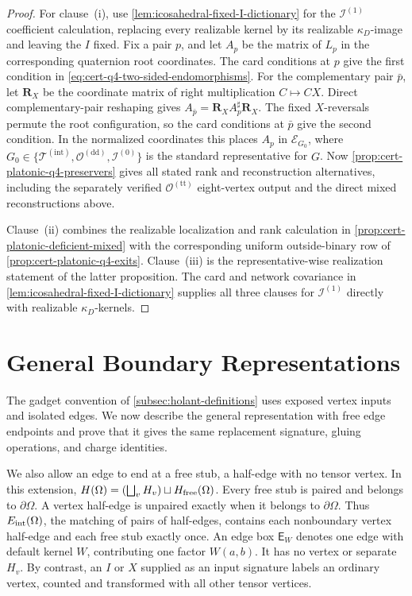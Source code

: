 \documentclass[11pt,letterpaper,onecolumn]{article}
\theoremstyle{plain}
\theoremstyle{definition}
\theoremstyle{remark}
\newcommand{\TetInt}{{\mathcal T^{(\mathrm{int})}}}
\newcommand{\OctDD}{{\mathcal O^{(\mathrm{dd})}}}
\newcommand{\OctTT}{{\mathcal O^{(\mathrm{tt})}}}
\newcommand{\IcoZero}{{\mathcal I^{(0)}}}
\newcommand{\IcoOne}{{\mathcal I^{(1)}}}
\begin{document}
\begin{proof}
For clause~\textnormal{(i)}, use
\cref{lem:icosahedral-fixed-I-dictionary} for the \(\IcoOne\)
coefficient calculation, replacing every realizable kernel by its realizable
\(\kappa_D\)-image and leaving the \(I\) fixed.  Fix a pair \(p\), and let \(A_p\)
be the matrix of \(L_p\) in the corresponding quaternion root coordinates.
The card conditions at \(p\) give the first condition in
\cref{eq:cert-q4-two-sided-endomorphisms}.  For the complementary pair
\(\bar p\), let \(\mathbf R_X\) be the coordinate matrix of right
multiplication \(C\mapsto CX\).  Direct complementary-pair reshaping gives
\(A_{\bar p}=\mathbf R_XA_p^\sharp\mathbf R_X\). The fixed \(X\)-reversals
permute the root configuration, so the card conditions at \(\bar p\) give
the second condition. In the normalized coordinates this places \(A_p\) in
\(\mathscr E_{G_0}\), where \(G_0\in\{\TetInt,\OctDD,\IcoZero\}\) is the standard representative for \(G\).
Now \cref{prop:cert-platonic-q4-preservers} gives all stated rank and
reconstruction alternatives, including the separately verified
\(\OctTT\) eight-vertex output and the direct mixed reconstructions above.

Clause~\textnormal{(ii)} combines the realizable localization and rank
calculation in \cref{prop:cert-platonic-deficient-mixed} with the
corresponding uniform outside-binary row of
\cref{prop:cert-platonic-q4-exits}.  Clause~\textnormal{(iii)} is the
representative-wise realization statement of the latter proposition.  The
card and network covariance in
\cref{lem:icosahedral-fixed-I-dictionary} supplies all three clauses for
\(\IcoOne\) directly with realizable \(\kappa_D\)-kernels.
\end{proof}


\section{General Boundary Representations}
\label{app:general-boundaries}

The gadget convention of \cref{subsec:holant-definitions} uses exposed
vertex inputs and isolated edges. We now describe the general representation
with free edge endpoints and prove that it gives the same replacement
signature, gluing operations, and charge identities.

We also allow an edge to end at a free stub, a half-edge with no tensor
vertex.  In this extension,
\(H(\Omega)=(\bigsqcup_vH_v)\sqcup H_{\rm free}(\Omega)\).
Every free stub is paired and belongs to \(\partial\Omega\). A vertex
half-edge is unpaired exactly when it belongs to \(\partial\Omega\).
Thus \(E_{\rm int}(\Omega)\), the matching of pairs of half-edges, contains each
nonboundary vertex half-edge and each free stub exactly once.  An edge box
\(\mathsf E_W\) denotes one edge with default kernel \(W\), contributing
one factor \(W(a,b)\).  It has no vertex or separate \(H_v\).
By contrast, an \(I\) or \(X\) supplied as an input signature labels an
ordinary vertex, counted and transformed with all other tensor vertices.
\end{document}
